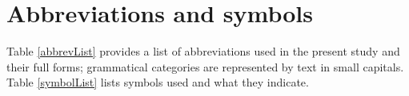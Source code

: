 %


\chapter*{Abbreviations and symbols}\label{abbreviations}
Table \vref{abbrevList} provides a list of abbreviations used in the present study and their full forms; grammatical categories are represented by text in {small capitals}. 
Table \ref{symbolList} lists symbols used and what they indicate. 

